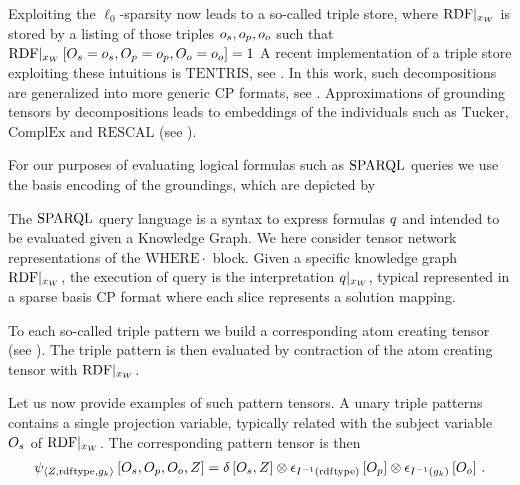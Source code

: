 Exploiting the $\ell_0$-sparsity now leads to a so-called triple store, where ${\mathrm{RDF}}|_{x_{W}}$ is stored by a listing of those triples $o_{s},o_{p},o_{o}$ such that ${\mathrm{RDF}}|_{x_{W}}\left[O_{s}=o_{s}, O_{p}=o_{p}, O_{o}=o_{o}\right]=1$
A recent implementation of a triple store exploiting these intuitions is $\mathrm{TENTRIS}$, see \cite{pan_tentris_2020}.
In this work, such decompositions are generalized into more generic CP formats, see .
Approximations of grounding tensors by decompositions leads to embeddings of the individuals such as $\mathrm{Tucker}$, $\mathrm{ComplEx}$ and $\mathrm{RESCAL}$ (see \cite{nickel_review_2016}).



For our purposes of evaluating logical formulas such as $\mathrm{SPARQL}$ queries we use the basis encoding of the groundings, which are depicted by
\begin{center}
    
\end{center}





The $\mathrm{SPARQL}$ query language is a syntax to express \firstOrderLogic{} formulas $q$ and intended to be evaluated given a Knowledge Graph.
We here consider tensor network representations of the $\mathrm{WHERE}{\cdot}$ block.
Given a specific knowledge graph ${\mathrm{RDF}}|_{x_{W}}$, the execution of query is the interpretation ${q}|_{x_{W}}$, typical represented in a sparse basis CP format where each slice represents a solution mapping.


To each so-called triple pattern we build a corresponding atom creating tensor (see ).
The triple pattern is then evaluated by contraction of the atom creating tensor with ${\mathrm{RDF}}|_{x_{W}}$.

Let us now provide examples of such pattern tensors.
A unary triple patterns contains a single projection variable, typically related with the subject variable $O_{s}$ of ${\mathrm{RDF}}|_{x_{W}}$.
The corresponding pattern tensor is then
\begin{align*}
    \psi_{\braket{Z,\mathrm{rdf}\mathrm{type},g_{k}}}\left[
        O_{s}, O_{p}, O_{o}, Z
    \right]
    = \delta\left[O_{s},Z\right]
    \otimes \epsilon_{I^{-1}(\mathrm{rdf}\mathrm{type})}\left[O_{p}\right]
    \otimes \epsilon_{I^{-1}(g_{k})}\left[O_{o}\right] \, .
\end{align*}

